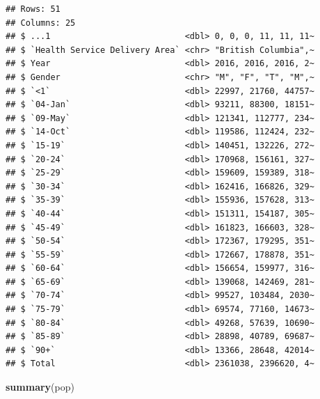 \documentclass[
  11pt,
  oneside]{book}
\newenvironment{Shaded}{\begin{snugshade}}{\end{snugshade}}
\newcommand{\FunctionTok}[1]{\textcolor[rgb]{0.13,0.29,0.53}{\textbf{#1}}}
\newcommand{\NormalTok}[1]{#1}
\begin{document}
\begin{verbatim}
## Rows: 51
## Columns: 25
## $ ...1                           <dbl> 0, 0, 0, 11, 11, 11~
## $ `Health Service Delivery Area` <chr> "British Columbia",~
## $ Year                           <dbl> 2016, 2016, 2016, 2~
## $ Gender                         <chr> "M", "F", "T", "M",~
## $ `<1`                           <dbl> 22997, 21760, 44757~
## $ `04-Jan`                       <dbl> 93211, 88300, 18151~
## $ `09-May`                       <dbl> 121341, 112777, 234~
## $ `14-Oct`                       <dbl> 119586, 112424, 232~
## $ `15-19`                        <dbl> 140451, 132226, 272~
## $ `20-24`                        <dbl> 170968, 156161, 327~
## $ `25-29`                        <dbl> 159609, 159389, 318~
## $ `30-34`                        <dbl> 162416, 166826, 329~
## $ `35-39`                        <dbl> 155936, 157628, 313~
## $ `40-44`                        <dbl> 151311, 154187, 305~
## $ `45-49`                        <dbl> 161823, 166603, 328~
## $ `50-54`                        <dbl> 172367, 179295, 351~
## $ `55-59`                        <dbl> 172667, 178878, 351~
## $ `60-64`                        <dbl> 156654, 159977, 316~
## $ `65-69`                        <dbl> 139068, 142469, 281~
## $ `70-74`                        <dbl> 99527, 103484, 2030~
## $ `75-79`                        <dbl> 69574, 77160, 14673~
## $ `80-84`                        <dbl> 49268, 57639, 10690~
## $ `85-89`                        <dbl> 28898, 40789, 69687~
## $ `90+`                          <dbl> 13366, 28648, 42014~
## $ Total                          <dbl> 2361038, 2396620, 4~
\end{verbatim}

\begin{Shaded}
\begin{Highlighting}[]
\FunctionTok{summary}\NormalTok{(pop)}
\end{Highlighting}
\end{Shaded}
\end{document}
